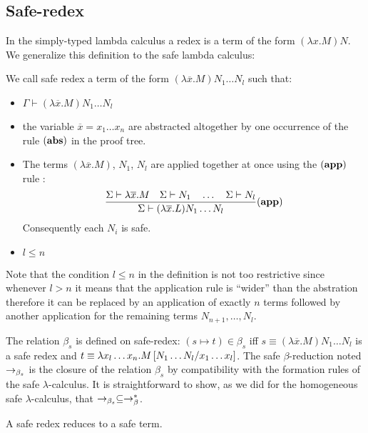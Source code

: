 \subsection{Safe-redex}
In the simply-typed lambda calculus a redex is a term of the form
$(\lambda x . M) N$. We generalize this definition to the safe
lambda calculus:
\begin{dfn}
We call safe redex a term of the form $(\lambda \overline{x} . M)
N_1 \ldots N_l$ such that:
\begin{itemize}
\item $ \Gamma \vdash (\lambda \overline{x} . M) N_1 \ldots N_l $
\item the variable $\overline{x}=x_1\ldots x_n$ are abstracted altogether by one occurrence of the rule $\mathbf{(abs)}$ in the proof tree.
\item The terms $(\lambda \overline{x} . M)$, $N_1$, $N_l$ are applied together at once using the $\mathbf{(app)}$ rule :
$$   \frac{\displaystyle 
            \Sigma \vdash \lambda \overline{x} . M
            \quad
            \Sigma \vdash N_1         \quad \ldots \quad \Sigma \vdash N_l
    }{
       \Sigma \vdash (\lambda \overline{x} . L) N_1 \ldots N_l
    } (\mathbf{app})
$$
Consequently each $N_i$ is safe.

\item $l\leq n$
\end{itemize}
\end{dfn}

Note that the condition $l\leq n$ in the definition is not too
restrictive since whenever $l>n$ it means that the application rule is ``wider'' than the abstration
therefore it can be replaced by an application of exactly $n$ terms
followed by another application for the remaining terms $N_{n+1},
\ldots, N_l$.


The relation $\beta_s$ is defined on safe-redex: $(s\mapsto t) \in
\beta_s$ iff $s \equiv (\lambda \overline{x} . M) N_1 \ldots N_l$ is
a safe redex and $t \equiv \lambda x_l \ldots x_n . M \left[ N_1
\ldots N_l/x_1 \ldots x_l \right]$. The safe $\beta$-reduction noted
$\rightarrow_{\beta_s}$ is the closure of the relation $\beta_s$ by
compatibility with the formation rules of the safe
$\lambda$-calculus. It is straightforward to show, as we did for the
homogeneous safe $\lambda$-calculus, that $\rightarrow_{\beta_s} \subseteq
\rightarrow_\beta^*$.


\begin{lem}
\label{lem:safereduction} A safe redex reduces to a safe term.
\end{lem}

